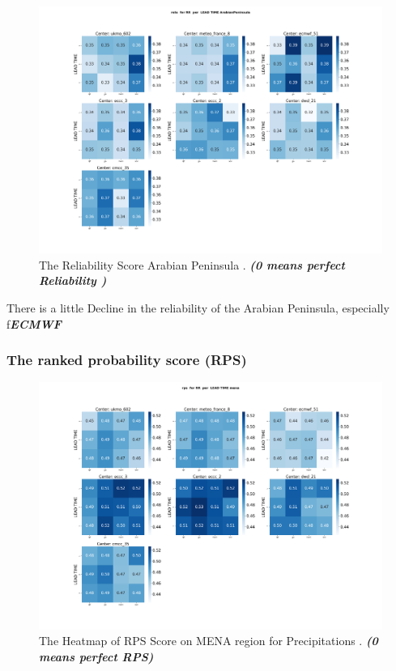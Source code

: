 \begin{figure}[H]
    \centering
    \includegraphics[scale=0.25]{plots/prob/rela/rela_RR_ArabianPeninsula.png}
    \caption{The Reliability Score Arabian Peninsula . \textbf{\textit{(0 means perfect Reliability )}}}
\end{figure}

There is a little Decline in the reliability of the Arabian Peninsula, especially f\textbf{\textit{ECMWF}}



\subsubsection{The ranked probability score (RPS)}


\begin{figure}[H]
    \centering
    \includegraphics[scale=0.25]{plots/prob/rps/rps_RR_mena.png}
    \caption{The Heatmap of  RPS Score on MENA region for Precipitations    . \textbf{\textit{(0 means perfect RPS)}}}
\end{figure}

